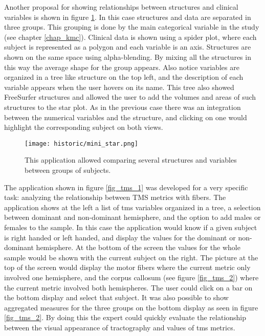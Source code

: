 Another proposal for showing relationships between structures and clinical variables is shown in figure \ref{fig_star_1}. In this case structures and data are separated in three groups. This grouping is done by the main categorical variable in the study (see chapter \ref{chap_kmc}). Clinical data is shown using a spider plot, where each subject is represented as a polygon and each variable is an axis. Structures are shown on the same space using alpha-blending. By mixing all the structures in this way the average shape for the group appears. Also notice variables are organized in a tree like structure on the top left, and the description of each variable appears when the user hovers on its name. This tree also showed FreeSurfer structures and allowed the user to add the volumes and areas of such structures to the star plot. As in the previous case there was an integration between the numerical variables and the structure, and clicking on one would highlight the corresponding subject on both views.

\begin{figure}
\centering
\texttt{[image: historic/mini\_star.png]} 
\caption{\label{fig_star_1}This application allowed comparing several structures and variables between groups of subjects.}
\end{figure}

The application shown in figure \ref{fig_tms_1} was developed for a very specific task: analyzing the relationship between TMS metrics with fibers. The application shows at the left a list of tms variables organized in a tree, a selection between dominant and non-dominant hemisphere, and the option to add males or females to the sample. In this case the application would know if a given subject is right handed or left handed, and display the values for the dominant or non-dominant hemisphere. At the bottom of the screen the values for the whole sample would be shown with the current subject on the right. The picture at the top of the screen would display the motor fibers where the current metric only involved one hemisphere, and the corpus callosum (see figure \ref{fig_tms_2}) where the current metric involved both hemispheres. The user could click on a bar on the bottom display and select that subject.
It was also possible to show aggregated measures for the three groups on the bottom display as seen in figure  \ref{fig_tms_2}. By doing this the expert could quickly evaluate the relationship between the visual appearance of tractography and values of tms metrics. 


